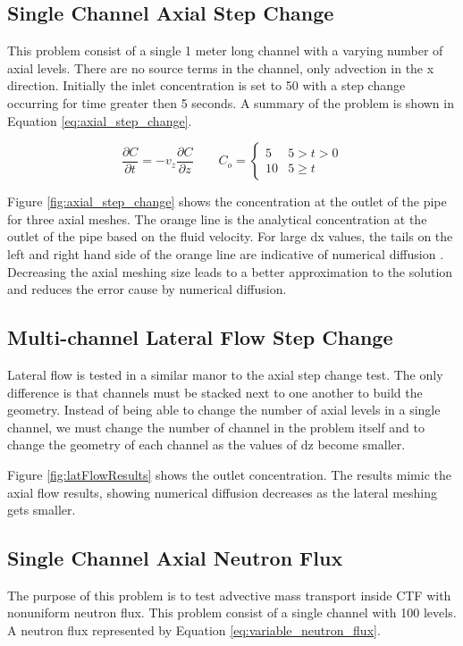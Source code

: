 \subsection{Single Channel Axial Step Change}
This problem consist of a single 1 meter long channel with a varying number of axial levels. There are no source terms in the channel, only advection in the x direction. Initially the inlet concentration is set to 50 with a step change occurring for time greater then 5 seconds. A summary of the problem is shown in Equation \ref{eq:axial_step_change}.

\begin{equation}
\frac{\partial C}{\partial t} = -v_{z} \frac{\partial C}{\partial z} \quad \quad C_{o} = \begin{cases}
5 &  5 > t > 0\\
10 & 5 \geq t
\end{cases}
\label{eq:axial_step_change}
\end{equation}

Figure \ref{fig:axial_step_change} shows the concentration at the outlet of the pipe for three axial meshes. The orange line is the analytical concentration at the outlet of the pipe based on the fluid velocity. For large dx values, the tails on the left and right hand side of the orange line are indicative of numerical diffusion \cite{versteeg2007}. Decreasing the axial meshing size leads to a better approximation to the solution and reduces the error cause by numerical diffusion. 

\subsection{Multi-channel Lateral Flow Step Change}
Lateral flow is tested in a similar manor to the axial step change test. The only difference is that channels must be stacked next to one another to build the geometry. Instead of being able to change the number of axial levels in a single channel, we must change the number of channel in the problem itself and to change the geometry of each channel as the values of dz become smaller. 

Figure \ref{fig:latFlowResults} shows the outlet concentration. The results mimic the axial flow results, showing numerical diffusion decreases as the lateral meshing gets smaller. 

\subsection{Single Channel Axial Neutron Flux}
The purpose of this problem is to test advective mass transport inside CTF with nonuniform neutron flux. This problem 
consist of a single channel with 100 levels. A neutron flux represented by Equation \ref{eq:variable_neutron_flux}.

